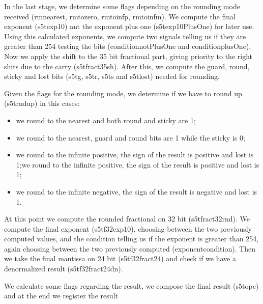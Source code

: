 In the last stage, we determine some flags depending on the rounding mode received (rm\textunderscore nearest, rm\textunderscore to\textunderscore zero, rm\textunderscore to\textunderscore infp, rm\textunderscore to\textunderscore infm). We compute the final exponent (s5t\textunderscore exp10) ant the exponent plus one (s5t\textunderscore exp10PlusOne) for later use. Using this calculated exponents, we compute two signals telling us if they are greater than 254 testing the bits (condition\textunderscore notPlusOne and condition\textunderscore plusOne).
Now we apply the shift to the 35 bit fractional part, giving priority to the right shits due to the carry (s5t\textunderscore fract35sh). After this, we compute the guard, round, sticky and lost bits (s5t\textunderscore g, s5t\textunderscore r, s5t\textunderscore s and s5t\textunderscore lost) needed for rounding.

Given the flags for the rounding mode, we determine if we have to round up (s5t\textunderscore rnd\textunderscore up) in this cases:
\begin{itemize}
\item we round to the nearest and both round and sticky are 1;
\item we round to the nearest, guard and round bits are 1 while the sticky is 0;
\item we round to the infinite positive, the sign of the result is positive and lost is 1;we round to the infinite positive, the sign of the result is positive and lost is 1;
\item we round to the infinite negative, the sign of the result is negative and lost is 1.
\end{itemize}

At this point we compute the rounded fractional on 32 bit (s5t\textunderscore fract32\textunderscore rnd). We compute the final exponent (s5t\textunderscore f32\textunderscore exp10), choosing between the two previously computed values, and the condition telling us if the exponent is greater than 254, again choosing between the two previously computed (exponent\textunderscore condition). Then we take the final mantissa on 24 bit (s5t\textunderscore f32\textunderscore fract24) and check if we have a denormalized result (s5t\textunderscore f32\textunderscore fract24dn).

We calculate some flags regarding the result, we compose the final result (s5t\textunderscore opc) and at the end we register the result



